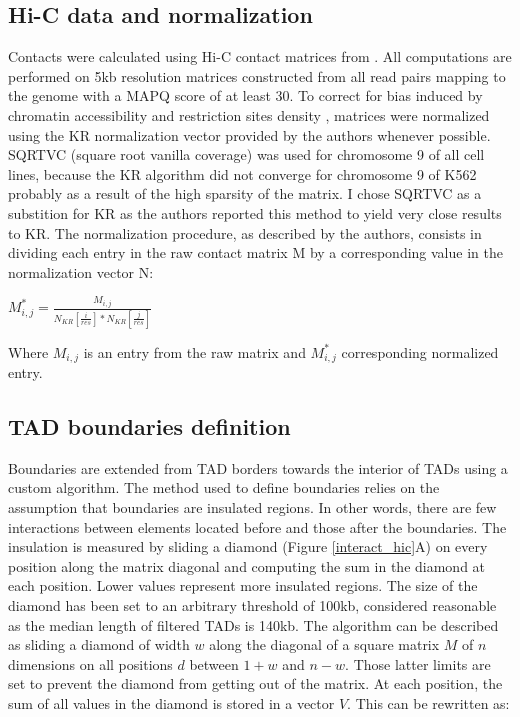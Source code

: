 \documentclass[11pt,a4paper]{report}
\begin{document}
\subsection*{Hi-C data and normalization}

Contacts were calculated using Hi-C contact matrices from \cite{Rao2014}. All computations are performed on 5kb resolution matrices constructed from all read pairs mapping to the genome with a MAPQ score of at least 30. To correct for bias induced by chromatin accessibility and restriction sites density \cite{Rao2014}, matrices were normalized using the KR normalization vector provided by the authors whenever possible. SQRTVC (square root vanilla coverage) was used for chromosome 9 of all cell lines, because the KR algorithm did not converge for chromosome 9 of K562 probably as a result of the high sparsity of the matrix. I chose SQRTVC as a substition for KR as the authors reported this method  to yield very close results to KR. 
The normalization procedure, as described by the authors, consists in dividing each entry in the raw contact matrix M by a corresponding value in the normalization vector N:

\vspace{0.2in}
$M^*_{i,j}=\frac{M_{i,j}}{N_{KR}[\frac{i}{res}]*N_{KR}[\frac{j}{res}]}$
\vspace{0.2in}

\noindent Where $M_{i,j}$ is an entry from the raw matrix and $M^*_{i,j}$ corresponding normalized entry.

\subsection*{TAD boundaries definition}

Boundaries are extended from TAD borders towards the interior of TADs using a custom algorithm. The method used to define boundaries relies on the assumption that boundaries are insulated regions. In other words, there are few interactions between elements located before and those after the boundaries. The insulation is measured by sliding a diamond (Figure \ref{interact_hic}A) on every position along the matrix diagonal and computing the sum in the diamond at each position. Lower values represent more insulated regions. The size of the diamond has been set to an arbitrary threshold of 100kb, considered reasonable as the median length of filtered TADs is 140kb. 
The algorithm can be described as sliding a diamond of width $w$  along the diagonal of a square matrix $M$ of $n$ dimensions on all positions $d$ between $1+w$ and $n-w$. Those latter limits are set to prevent the diamond from getting out of the matrix. At each position, the sum of all values in the diamond is stored in a vector $V$. This can be rewritten as: 
\end{document}
